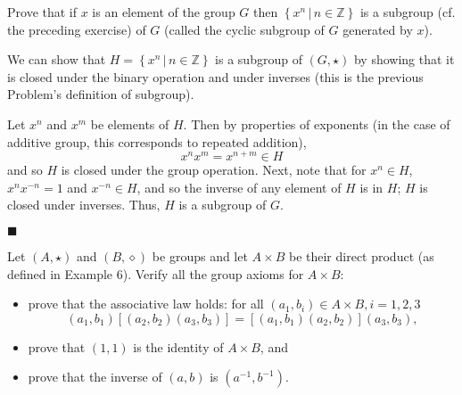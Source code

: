 \documentclass[12pt]{article}
\renewcommand{\qed}{\hfill$\blacksquare$}
\renewenvironment{proof}{\begin{addmargin}[1em]{0em}\begin{newproof}}{\end{newproof}\end{addmargin}\qed}
\newenvironment{problem}[2][Exercise]{\begin{trivlist}
\item[\hskip \labelsep {\bfseries #1}\hskip \labelsep {\bfseries #2.}]}{\end{trivlist}}
\begin{document}
\begin{problem}{1.1.27}
Prove that if $x$ is an element of the group $G$ then $\left\{x^n \, | \, n\in \mathbb{Z}\right\}$ is a subgroup (cf. the preceding exercise) of $G$ (called the cyclic subgroup of $G$ generated by $x$).
\end{problem}
\begin{proof}
We can show that $H = \left\{x^n \, | \, n\in \mathbb{Z}\right\}$ is a subgroup of $\left(G,\star \right)$ by showing that it is closed under the binary operation and under inverses (this is the previous Problem's definition of subgroup).

Let $x^n$ and $x^m$ be elements of $H$. Then by properties of exponents (in the case of additive group, this corresponds to repeated addition), $$ x^nx^m = x^{n+m} \in H $$
and so $H$ is closed under the group operation. Next, note that for $x^n \in H$, $x^n x^{-n} = 1$ and $x^{-n}\in H$, and so the inverse of any element of $H$ is in $H$; $H$ is closed under inverses. Thus, $H$ is a subgroup of $G$.
\end{proof}





\begin{problem}{1.1.28}
Let $\left(A,\star\right)$ and $\left(B,\diamond\right)$ be groups and let $A\times B$ be their direct product (as defined in Example 6). Verify all the group axioms for $A\times B$:
\begin{itemize}
    \item prove that the associative law holds: for all $\left(a_1,b_i\right)\in A\times B, i=1,2,3$ $$\left(a_1,b_1\right)\left[ \left(a_2,b_2\right)\left(a_3,b_3\right)\right] = \left[\left(a_1,b_1\right)\left(a_2,b_2\right)\right]\left(a_3,b_3\right),$$
    \item prove that $\left(1,1\right)$ is the identity of $A\times B$, and
    \item prove that the inverse of $\left(a,b\right)$ is $\left(a^{-1},b^{-1}\right)$.
\end{itemize}
\end{problem}
\end{document}
